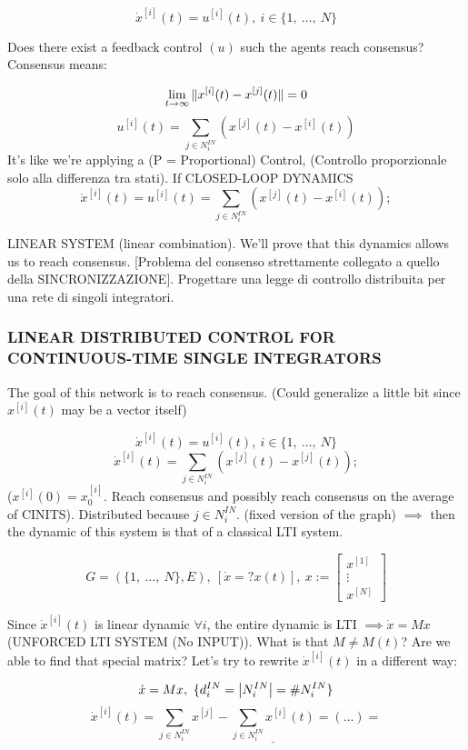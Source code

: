 \[
	\dot{x}^{[i]}(t) = u^{[i]}(t),\ i\in\{1,\ \dots,\ N\}
\]

Does there exist a feedback control $(u)$ such the agents reach consensus? Consensus means:

\[
	\lim_{t\to\infty}{\lVert x^{[i]}(t)-x^{[j]}(t)\rVert} = 0
\]
\[
	u^{[i]}(t) = \sum_{j\in N_i^{IN}}{(x^{[j]}(t) - x^{[i]}(t))}
\]
It's like we're applying a (P = Proportional) Control, (Controllo proporzionale solo alla differenza tra stati). If CLOSED-LOOP DYNAMICS
\[
	\dot{x}^{[i]}(t) = u^{[i]}(t) = \sum_{j\in N_i^{IN}}{(x^{[j]}(t) - x^{[i]}(t))};
\]

LINEAR SYSTEM (linear combination). We'll prove that this dynamics allows us to reach consensus. [Problema del consenso strettamente collegato a quello della SINCRONIZZAZIONE]. Progettare una legge di controllo distribuita per una rete di singoli integratori.

\subsubsection{LINEAR DISTRIBUTED CONTROL FOR CONTINUOUS-TIME SINGLE INTEGRATORS}

The goal of this network is to reach consensus. (Could generalize a little bit since $x^{[i]}(t)$ may be a vector itself)

\[
	\dot{x}^{[i]}(t) = u^{[i]}(t),\ i\in\{1,\ \dots,\ N\}
\]
\[
	\dot{x}^{[i]}(t) = \sum_{j\in N_i^{IN}}{(x^{[j]}(t) - x^{[j]}(t))};
\]
($x^{[i]}(0)=x_0^{[i]}$. Reach consensus and possibly reach consensus on the average of CINITS).
Distributed because $j\in N_i^{IN}$. (fixed version of the graph) $\implies$ then the dynamic of this system is that of a classical LTI system.

\[
	G=(\{1,\ \dots,\ N\}, E),\ [\dot{x}=?x(t)],\ x := \begin{bmatrix}x^{[1]}\\ \vdots\\x^{[N]}\end{bmatrix}
\]

Since $\dot{x}^{[i]}(t)$ is linear dynamic $\forall i$, the entire dynamic is LTI $\implies \dot{x}=Mx$ (UNFORCED LTI SYSTEM (No INPUT)). What is that $M\neq M(t)$? Are we able to find that special matrix? Let's try to rewrite $\dot{x}^{[i]}(t)$ in a different way:

\[
	\dot{x}=Mx,\ \{d_i^{IN} = \left\vert{N_i^{IN}}\right\vert = \# N_i^{IN}\}
\]
\[	
	\dot{x}^{[i]}(t) = \sum_{j\in N_i^{IN}}{x^{[j]}}-\underline{\sum_{j\in N_i^{IN}}{x^{[i]}(t)}} = (\dots) =
\]

